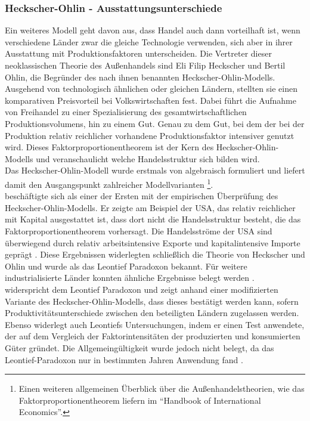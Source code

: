 \subsubsection*{Heckscher-Ohlin - Ausstattungsunterschiede}
%
Ein weiteres Modell geht davon aus, dass Handel auch dann vorteilhaft ist, wenn verschiedene Länder zwar die gleiche Technologie verwenden, sich aber in ihrer Ausstattung mit Produktionsfaktoren unterscheiden. Die Vertreter dieser neoklassischen Theorie des Außenhandels sind Eli Filip Heckscher und Bertil Ohlin, die Begründer des nach ihnen benannten Heckscher-Ohlin-Modells. Ausgehend von technologisch ähnlichen oder gleichen Ländern, stellten sie einen komparativen Preisvorteil bei Volkswirtschaften fest. Dabei führt die Aufnahme von Freihandel zu einer Spezialisierung des gesamtwirtschaftlichen Produktionsvolumens, hin zu einem Gut. Genau zu dem Gut, bei dem der bei der Produktion relativ reichlicher vorhandene Produktionsfaktor intensiver genutzt wird. Dieses Faktorproportionentheorem ist der Kern des Heckscher-Ohlin-Modells und veranschaulicht welche Handelsstruktur sich bilden wird.\\
%
Das Heckscher-Ohlin-Modell wurde erstmals von \cite{Jones.1965} algebraisch formuliert und liefert damit den Ausgangspunkt zahlreicher Modellvarianten \cite{Davis.2001,Trefler.1993,Deardorff.1984}\footnote{Einen weiteren allgemeinen Überblick über die Außenhandelstheorien, wie das Faktorproportionentheorem liefern \cite{Jones.1984} im "`Handbook of International Economics"'.}.\\
%
\cite{Leontief.1953} beschäftigte sich als einer der Ersten mit der empirischen Überprüfung des Heckscher-Ohlin-Modells. Er zeigte am Beispiel der USA, das relativ reichlicher mit Kapital ausgestattet ist, dass dort nicht die Handelsstruktur besteht, die das Faktorproportionentheorem vorhersagt.  Die Handelsströme der USA sind überwiegend durch relativ arbeitsintensive Exporte und kapitalintensive Importe geprägt \cite{Leontief.1953}. Diese Ergebnissen widerlegten schließlich die Theorie von Heckscher und Ohlin und wurde als das Leontief Paradoxon bekannt. Für weitere industrialisierte Länder konnten ähnliche Ergebnisse belegt werden \cite{Gruber.1970,Maskus.1985}.\\
%
\cite{Trefler.1993} widerspricht dem Leontief Paradoxon und zeigt anhand einer modifizierten Variante des Heckscher-Ohlin-Modells, dass dieses bestätigt werden kann, sofern Produktivitätsunterschiede zwischen den beteiligten Ländern zugelassen werden. Ebenso widerlegt auch \cite{Leamer.1980} Leontiefs Untersuchungen, indem er einen Test anwendete, der auf dem Vergleich der Faktorintensitäten der produzierten und konsumierten Güter gründet. Die Allgemeingültigkeit wurde jedoch nicht belegt, da das Leontief-Paradoxon nur in bestimmten Jahren Anwendung fand \cite{Stern.1981}.\\
